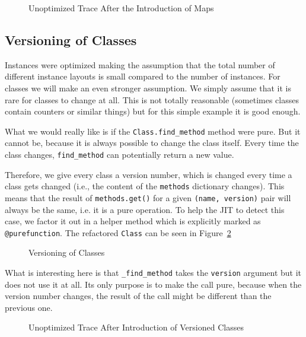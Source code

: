\documentclass{sigplanconf}
\begin{document}
\begin{figure}

\caption{Unoptimized Trace After the Introduction of Maps}
\label{fig:trace2}
\end{figure}





\subsection{Versioning of Classes}

Instances were optimized making the assumption that the total number of
different instance layouts is small compared to the number of instances. For classes we
will make an even stronger assumption. We simply assume that it is rare for
classes to change at all. This is not totally reasonable (sometimes classes contain
counters or similar things) but for this simple example it is good enough.

What we would really like is if the \texttt{Class.find\_method} method were pure.
But it cannot be, because it is always possible to change the class itself.
Every time the class changes, \texttt{find\_method} can potentially return a
new value.

Therefore, we give every class a version number, which is changed every time a
class gets changed (i.e., the content of the \texttt{methods} dictionary changes).
This means that the result of \texttt{methods.get()} for a given \texttt{(name,
version)} pair will always be the same, i.e. it is a pure operation.  To help
the JIT to detect this case, we factor it out in a helper method which is
explicitly marked as \texttt{@purefunction}. The refactored \texttt{Class} can
be seen in Figure~\ref{fig:version}

\begin{figure}

\caption{Versioning of Classes}
\label{fig:version}
\end{figure}

What is interesting here is that \texttt{\_find\_method} takes the \texttt{version}
argument but it does not use it at all. Its only purpose is to make the call
pure, because when the version number changes, the result of the call might be
different than the previous one.

\begin{figure}

\caption{Unoptimized Trace After Introduction of Versioned Classes}
\label{fig:trace4}
\end{figure}
\end{document}
